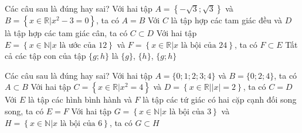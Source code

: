\begin{ex}%
	Các  câu sau là đúng hay sai?
	\choiceTF 
		{\True Với hai tập $A=\left\{-\sqrt{3};\sqrt{3}\right\}$ và  $B=\left\{x\in\mathbb{R}\Big|x^2-3=0\right\}$, ta có $A=B$}
		{\True Với $C$ là tập  hợp các tam giác đều và $D$ là tập hợp các tam giác cân, ta có $C\subset D$}
		{Với hai tập $E=\left\{x\in\mathbb{N}\Big|x \text{ là ước của  } 12\right\}$ và $F=\left\{x\in\mathbb{R}\Big|x \text{ là bội của } 24\right\}$, ta có $F\subset E$}
		{Tất cả các tập con của  tập $\{g;h\}$ là $\{g\}$, $\{h\}$, $\{g;h\}$}
\end{ex}

\begin{ex}%
	Các câu sau là  đúng hay sai?
	 \choiceTF
		{Với hai tập  $A=\{0;1;2;3;4\}$ và $B=\{0;2;4\}$, ta có $A\subset B$}
		{\True Với hai tập $C=\left\{x\in\mathbb{R}\Big|x^2=4\right\}$ và $D=\left\{x\in\mathbb{R}\Big||x|=2\right\}$, ta có $C=D$} 
		{\True Với $E$  là tập các hình bình hành và $F$ là tập các tứ giác có hai cặp cạnh đối song song, ta có $E=F$}
		{Với hai tập $G=\left\{x\in\mathbb{N}\Big|x \text{ là bội của } 3\right\}$ và $H=\left\{x\in\mathbb{N}\Big|x \text{ là bội của } 6\right\}$, ta có  $G\subset H$}
\end{ex}

